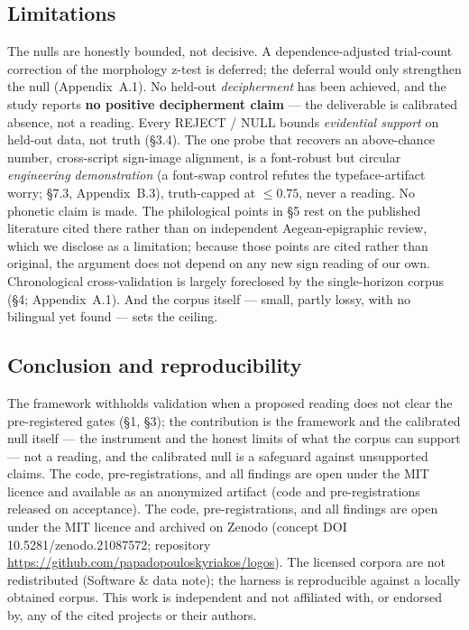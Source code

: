 \subsection{Limitations}

The nulls are honestly bounded, not decisive. A dependence-adjusted
trial-count correction of the morphology z-test is deferred; the deferral
would only strengthen the null (Appendix~A.1). No held-out
\emph{decipherment} has
been achieved, and the study reports \textbf{no positive decipherment
claim} --- the deliverable is calibrated absence, not a reading. Every REJECT / NULL bounds \emph{evidential support} on held-out
data, not truth (\S3.4). The one probe that recovers an above-chance
number, cross-script sign-image alignment, is a font-robust but circular
\emph{engineering demonstration} (a font-swap control refutes the
typeface-artifact worry; \S7.3, Appendix~B.3), truth-capped at
$\le 0.75$, never a reading. No
phonetic claim is made. The philological points in \S5 rest on the
published literature cited there rather than on independent
Aegean-epigraphic
review, which we disclose as a limitation; because those points are cited
rather than original, the argument does not depend on any new sign reading
of our own. Chronological cross-validation is largely foreclosed by the
single-horizon corpus (\S4; Appendix~A.1). And the corpus itself
--- small, partly lossy, with no bilingual yet found
\citep[\S8]{salgarella2025} --- sets the ceiling.

\subsection{Conclusion and reproducibility}

The framework withholds validation when a proposed reading does not clear
the pre-registered gates (\S1, \S3); the contribution is the
framework and the calibrated null itself --- the instrument and the honest
limits of what the corpus can support --- not a reading, and the calibrated
null is a safeguard against unsupported claims.
\ifanon
The code, pre-registrations, and all findings are open under the MIT
licence and available as an anonymized artifact (code and pre-registrations
released on acceptance).
\else
The code, pre-registrations, and all findings are open under the MIT
licence and archived on Zenodo (concept DOI 10.5281/zenodo.21087572;
repository \url{https://github.com/papadopouloskyriakos/logos}).
\fi
The licensed corpora are not redistributed (Software \& data note);
the harness is reproducible against a locally obtained corpus. This work
is independent and not affiliated with, or endorsed by, any of the cited
projects or their authors.

